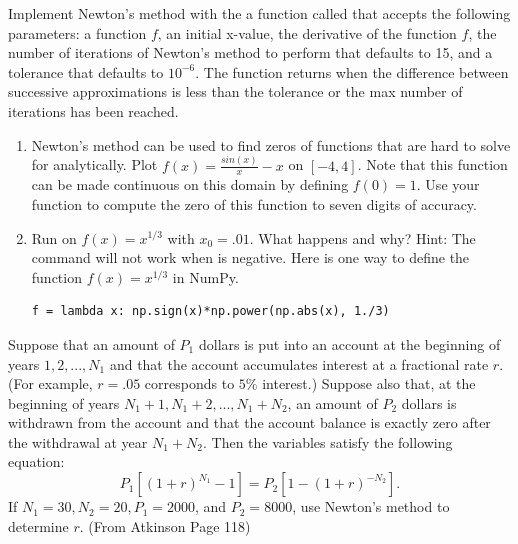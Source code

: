 \begin{problem}
\label{prob:newton_arr}
\leavevmode

Implement Newton's method with the a function called  that accepts the following parameters: a function $f$, an initial x-value, the derivative of the function $f$, the number of iterations of Newton's method to perform that defaults to 15, and a tolerance that defaults to $10^{-6}$.  
The function  returns when the difference between successive approximations is less than the tolerance or the max number of iterations has been reached.
\end{problem}

\begin{problem}
\begin{enumerate}
\label{prob:functions}

\item Newton's method can be used to find zeros of functions that are hard to solve for analytically.
Plot $f(x) = \frac{sin(x)}{x}-x$ on $[-4, 4]$. 
Note that this function can be made continuous on this domain by defining $f(0)=1$. 
Use your function  to compute the zero of this function to seven digits of accuracy.
\item Run  on $f(x)=x^{1/3}$ with $x_0=.01$. 
What happens and why?
Hint: The command  will not work when  is negative. 
Here is one way to define the function $f(x)=x^{1/3}$ in NumPy.
\begin{lstlisting}
f = lambda x: np.sign(x)*np.power(np.abs(x), 1./3)
\end{lstlisting}
\end{enumerate}
\end{problem}

\begin{problem}
Suppose that an amount of $P_1$ dollars is put into an account at the beginning of years $1, 2,..., N_1$ and that the account accumulates interest at a fractional rate $r$.  
(For example, $r = .05$ corresponds to $5\%$ interest.) 
Suppose also that, at the beginning of years $N_1 + 1, N_1 + 2, ..., N_1 + N_2$, an amount of $P_2$ dollars is withdrawn from the account and that the account balance is exactly zero after the withdrawal at year $N_1 + N_2$.
Then the variables satisfy the following equation:
\[
P_1[(1+r)^{N_1} - 1] = P_2[1-(1+r)^{-N_2}].
\]
If $N_1 =30, N_2 =20, P_1 =2000$, and $P_2 =8000$, use Newton's method to
determine $r$.
(From Atkinson Page 118)
\end{problem}

